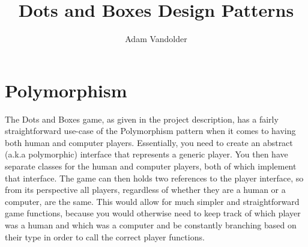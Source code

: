 \documentclass{article}
\title{Dots and Boxes Design Patterns}
\author{Adam Vandolder}
\begin{document}
    \section{Polymorphism}
    The Dots and Boxes game, as given in the project description, has a fairly
    straightforward use-case of the Polymorphism pattern when it comes to having
    both human and computer players. Essentially, you need to create an abstract
    (a.k.a polymorphic) interface that represents a generic player. You then
    have separate classes for the human and computer players, both of which
    implement that interface. The game can then holds two references to the
    player interface, so from its perspective all players, regardless of whether
    they are a human or a computer, are the same. This would allow for much 
    simpler and straightforward game functions, because you would otherwise need
    to keep track of which player was a human and which was a computer and be
    constantly branching based on their type in order to call the correct player
    functions.
    \section{}
\end{document}
